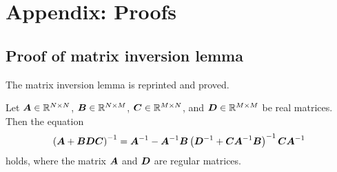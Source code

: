 \documentclass[twocolumn,a4paper,10pt]{article}
\begin{document}

\pagebreak
\appendix

\section{Appendix: Proofs}\titlebar

\subsection{Proof of matrix inversion lemma}

The matrix inversion lemma is reprinted and proved.

\begin{theorem}
    Let
    $\boldsymbol{A} \in \mathbb{R}^{N \times N}$,
    $\boldsymbol{B} \in \mathbb{R}^{N \times M}$,
    $\boldsymbol{C} \in \mathbb{R}^{M \times N}$,
    and
    $\boldsymbol{D} \in \mathbb{R}^{M \times M}$
    be real matrices. Then the equation
    \begin{equation}
        \left( \boldsymbol{A} + \boldsymbol{BDC} \right)^{-1} = \boldsymbol{A}^{-1} - \boldsymbol{A}^{-1} \boldsymbol{B}
        \left( \boldsymbol{D}^{-1} + \boldsymbol{CA}^{-1} \boldsymbol{B} \right)^{-1} \boldsymbol{CA}^{-1}
    \end{equation}
    holds, where the matrix $\boldsymbol{A}$ and $\boldsymbol{D}$ are regular matrices.
\end{theorem}
\end{document}
